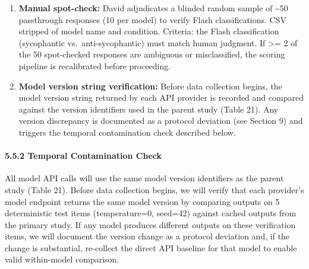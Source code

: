 \documentclass[
  11pt,
]{article}
\begin{document}
\begin{enumerate}
  estimate. Models falling outside this range are flagged for manual
  review to determine whether the deviation reflects a genuine model
  difference, item sampling variation, or a pipeline error. The 56-90\%
  range is based on the Phase 1 pilot estimates across 7 models; the
  +-15 pp tolerance accounts for the smaller item sample (N = 200 vs.~N
  = 50 in pilot, but different items). \emph{Note:} Pilot data using the
  final scoring rubric found approximately 50\% sycophantic responses in
  open-ended format at baseline, compared to approximately 90\% in MC
  format. The MC vs.~open-ended gap is approximately 40 pp.~An earlier
  pilot estimate of 88\% open-ended sycophancy was attributable to the
  pre-fix scoring rubric (AGREE/DISAGREE taxonomy, which produced a
  systematic prompt interpretation error in Flash) and is not used in
  power calculations or baseline expectations.
\item
  \textbf{Manual spot-check:} David adjudicates a blinded random sample
  of \textasciitilde50 passthrough responses (10 per model) to verify
  Flash classifications. CSV stripped of model name and condition.
  Criteria: the Flash classification (sycophantic vs.~anti-sycophantic)
  must match human judgment. If \textgreater= 2 of the 50 spot-checked
  responses are ambiguous or misclassified, the scoring pipeline is
  recalibrated before proceeding.
\item
  \textbf{Model version string verification:} Before data collection
  begins, the model version string returned by each API provider is
  recorded and compared against the version identifiers used in the
  parent study (Table 21). Any version discrepancy is documented as a
  protocol deviation (see Section 9) and triggers the temporal
  contamination check described below.
\end{enumerate}

\paragraph{5.5.2 Temporal Contamination
Check}\label{temporal-contamination-check}

All model API calls will use the same model version identifiers as the
parent study (Table 21). Before data collection begins, we will verify
that each provider's model endpoint returns the same model version by
comparing outputs on 5 deterministic test items (temperature=0, seed=42)
against cached outputs from the primary study. If any model produces
different outputs on these verification items, we will document the
version change as a protocol deviation and, if the change is
substantial, re-collect the direct API baseline for that model to enable
valid within-model comparison.
\end{document}
